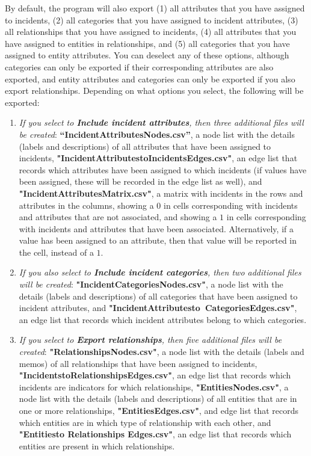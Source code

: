\documentclass{memoir}
\begin{document}
By default, the program will also export (1) all attributes that you have assigned to incidents, (2) all categories that you have assigned to incident attributes, (3) all relationships that you have assigned to incidents, (4) all attributes that you have assigned to entities in relationships, and (5) all categories that you have assigned to entity attributes. You can deselect any of these options, although categories can only be exported if their corresponding attributes are also exported, and entity attributes and categories can only be exported if you also export relationships. Depending on what options you select, the following will be exported:
\begin{enumerate}
\item{\emph{If you select to \textbf{Include incident attributes}, then three additional files will be created}: \textbf{``Incident\textunderscore Attributes\textunderscore Nodes.csv''}, a node list with the details (labels and descriptions) of all attributes that have been assigned to incidents, \textbf{"Incident\textunderscore Attributes\textunderscore to\textunderscore Incidents\textunderscore Edges.csv"}, an edge list that records which attributes have been assigned to which incidents (if values have been assigned, these will be recorded in the edge list as well), and \textbf{"Incident\textunderscore Attributes\textunderscore Matrix.csv"}, a matrix with incidents in the rows and attributes in the columns, showing a \(0\) in cells corresponding with incidents and attributes that are not associated, and showing a \(1\) in cells corresponding with incidents and attributes that have been associated. Alternatively, if a value has been assigned to an attribute, then that value will be reported in the cell, instead of a \(1\).}
\item{\emph{If you also select to \textbf{Include incident categories}, then two additional files will be created}: \textbf{"Incident\textunderscore Categories\textunderscore Nodes.csv"}, a node list with the details (labels and descriptions) of all categories that have been assigned to incident attributes, and \textbf{"Incident\textunderscore Attributes\textunderscore to\textunderscore\ Categories\textunderscore Edges.csv"}, an edge list that records which incident attributes belong to which categories.}
\item{\emph{If you select to \textbf{Export relationships}, then five additional files will be created}: \textbf{"Relationships\textunderscore Nodes.csv"}, a node list with the details (labels and memos) of all relationships that have been assigned to incidents, \textbf{"Incidents\textunderscore to\textunderscore Relationships\textunderscore Edges.csv"}, an edge list that records which incidents are indicators for which relationships, \textbf{"Entities\textunderscore Nodes.csv"}, a node list with the details (labels and descriptions) of all entities that are in one or more relationships, \textbf{"Entities\textunderscore Edges.csv"}, and edge list that records which entities are in which type of relationship with each other, and \textbf{"Entities\textunderscore to \textunderscore Relationships \textunderscore Edges.csv"}, an edge list that records which entities are present in which relationships.}

\end{enumerate}
\end{document}
